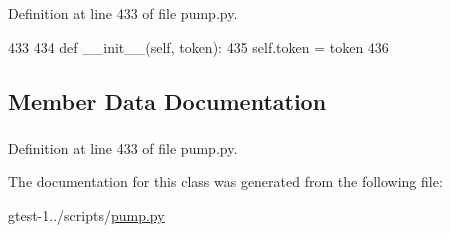 \-Definition at line 433 of file pump.\-py.


\begin{DoxyCode}
433 
434   def __init__(self, token):
435     self.token = token
436 

\end{DoxyCode}


\subsection{\-Member \-Data \-Documentation}
\hypertarget{classpump_1_1LiteralDollarNode_a87da3d8264af1c9427605148f20dd9c4}{
\subsubsection[{token}]{}}\label{d0/d8c/classpump_1_1LiteralDollarNode_a87da3d8264af1c9427605148f20dd9c4}


\-Definition at line 433 of file pump.\-py.



\-The documentation for this class was generated from the following file\-:\begin{DoxyCompactItemize}
\item 
gtest-\/1../scripts/\hyperlink{pump_8py}{pump.\-py}\end{DoxyCompactItemize}
